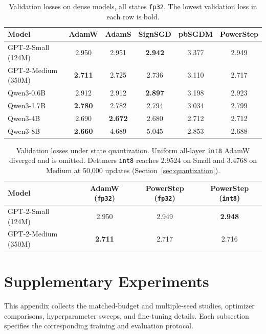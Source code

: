 \documentclass{article}
\begin{document}
\begin{table}[!htbp]
    \centering
    \small        
    
    \begin{tabular}{l c c c c c}
        \toprule
        {Model}  & AdamW & AdamS & SignSGD & pbSGDM & PowerStep \\
        \midrule
        GPT-2-Small (124M) & 2.950 & 2.951 & \textbf{2.942} & 3.377 & 2.949 \\
        GPT-2-Medium (350M) & \textbf{2.711} & 2.725 & 2.736 & 3.110 & 2.717 \\
        Qwen3-0.6B & 2.912 & 2.912 & \textbf{2.897} & 3.198 & 2.923 \\
        Qwen3-1.7B & \textbf{2.780} & {2.782} & 2.794 & 3.034 & 2.799 \\
        Qwen3-4B & 2.690 & \textbf{2.672} & 2.680 & 2.712 & 2.712 \\
        Qwen3-8B & \textbf{2.660} & 4.689 & 5.045 & 2.853 & 2.688 \\    
        \bottomrule
    \end{tabular}
\caption{Validation losses on dense models, all states \texttt{fp32}. The lowest validation loss in each row is bold.}
    \label{tab:valid_loss_small}    
\end{table}

\begin{table}[!htbp]
    \centering
    \small        
    
    \begin{tabular}{l c c c}
        \toprule
        {Model}  & {AdamW (\texttt{fp32})} & {PowerStep (\texttt{fp32})} & {PowerStep (\texttt{int8})} \\
        \midrule
        GPT-2-Small (124M)   & 2.950 & 2.949 & \textbf{2.948} \\
        GPT-2-Medium (350M)  & \textbf{2.711} & 2.717 & 2.716 \\
        \bottomrule
    \end{tabular}
\caption{Validation losses under state quantization. Uniform all-layer \texttt{int8} AdamW diverged and is omitted. Dettmers \texttt{int8} reaches 2.9524 on Small and 3.4768 on Medium at 50,000 updates (Section~\ref{sec:quantization}).}
    \label{tab:quant_valid}    
\end{table}


\FloatBarrier
\section{Supplementary Experiments}\label{sec:additional}
This appendix collects the matched-budget and multiple-seed studies, optimizer comparisons, hyperparameter sweeps, and fine-tuning details. Each subsection specifies the corresponding training and evaluation protocol.
\end{document}
